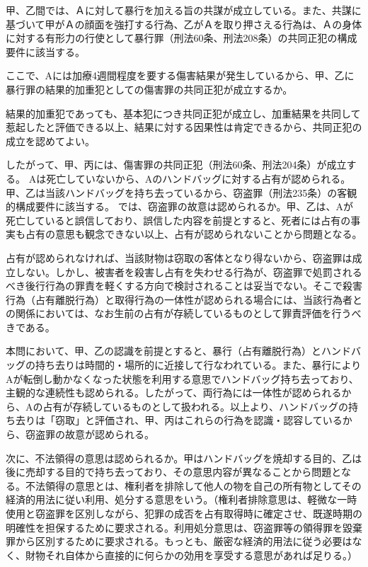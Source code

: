 \documentclass[11pt]{jsarticle}
\title{\vspace{-30mm}{\textgt{\Large{\fbox{７} 男の恨みは夜の闇より深く}}}}
\date{\vspace{-15mm}}
\begin{document}
\maketitle

	甲、乙間では、Ａに対して暴行を加える旨の共謀が成立している。また、共謀に基づいて甲がＡの顔面を強打する行為、乙がＡを取り押さえる行為は、Ａの身体に対する有形力の行使として暴行罪（刑法60条、刑法208条）の共同正犯の構成要件に該当する。

	ここで、Aには加療4週間程度を要する傷害結果が発生しているから、甲、乙に暴行罪の結果的加重犯としての傷害罪の共同正犯が成立するか。
	
	結果的加重犯であっても、基本犯につき共同正犯が成立し、加重結果を共同して惹起したと評価できる以上、結果に対する因果性は肯定できるから、共同正犯の成立を認めてよい。
	
	したがって、甲、丙には、傷害罪の共同正犯（刑法60条、刑法204条）が成立する。
	\sectionB{}
		Aは死亡していないから、Aのハンドバッグに対する占有が認められる。甲、乙は当該ハンドバッグを持ち去っているから、窃盗罪（刑法235条）の客観的構成要件に該当する。
	\sectionB{}
		では、窃盗罪の故意は認められるか。甲、乙は、Aが死亡していると誤信しており、誤信した内容を前提とすると、死者には占有の事実も占有の意思も観念できない以上、占有が認められないことから問題となる。
		
		占有が認められなければ、当該財物は窃取の客体となり得ないから、窃盗罪は成立しない。しかし、被害者を殺害し占有を失わせる行為が、窃盗罪で処罰されるべき後行行為の罪責を軽くする方向で検討されることは妥当でない。そこで殺害行為（占有離脱行為）と取得行為の一体性が認められる場合には、当該行為者との関係においては、なお生前の占有が存続しているものとして罪責評価を行うべきである。
		
		本問において、甲、乙の認識を前提とすると、暴行（占有離脱行為）とハンドバッグの持ち去りは時間的・場所的に近接して行なわれている。また、暴行によりAが転倒し動かなくなった状態を利用する意思でハンドバッグ持ち去っており、主観的な連続性も認められる。したがって、両行為には一体性が認められるから、Aの占有が存続しているものとして扱われる。以上より、ハンドバッグの持ち去りは「窃取」と評価され、甲、丙はこれらの行為を認識・認容しているから、窃盗罪の故意が認められる。
		
		\sectionB{}次に、不法領得の意思は認められるか。甲はハンドバッグを焼却する目的、乙は後に売却する目的で持ち去っており、その意思内容が異なることから問題となる。不法領得の意思とは、権利者を排除して他人の物を自己の所有物としてその経済的用法に従い利用、処分する意思をいう。（権利者排除意思は、軽微な一時使用と窃盗罪を区別しながら、犯罪の成否を占有取得時に確定させ、既遂時期の明確性を担保するために要求される。利用処分意思は、窃盗罪等の領得罪を毀棄罪から区別するために要求される。もっとも、厳密な経済的用法に従う必要はなく、財物それ自体から直接的に何らかの効用を享受する意思があれば足りる。）
		
\end{document}
